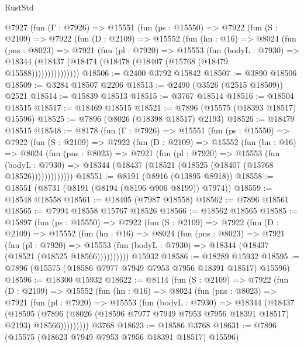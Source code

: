 \begin{lexlean}{RustStd}
\begin{coremodule}
    @7927
      (fun (Γ : @7926) =>
      @15551
        (fun (ps : @15550) =>
        @7922
          (fun (S : @2109) =>
          @7922
            (fun (D : @2109) =>
            @15552
              (fun (hn : @16) =>
              @8024
                (fun (pns : @8023) =>
                @7921
                  (fun (pl : @7920) =>
                  @15553
                    (fun (bodyL : @7930) =>
                    @18344 (@18437 (@18474 (@18478 (@18407 (@15768 (@18479 @15588)))))))))))))))
@18506 := @2400 @3792 @15842
@18507 := @3890 @18506
@18509 := @3284 @18507 @2206
@18513 := @2490 (@3526 (@2515 @18509)) @2521
@18514 := @15839 @18513
@18515 := @3767 @18514
@18516 := @18504 @18515
@18517 := @18469 @18515
@18521 := @7896 (@15575 (@18393 @18517) @15596)
@18525 := @7896 (@8026 (@18398 @18517) @2193)
@18526 := @18479 @18515
@18548 := @8178
    (fun (Γ : @7926) =>
    @15551
      (fun (ps : @15550) =>
      @7922
        (fun (S : @2109) =>
        @7922
          (fun (D : @2109) =>
          @15552
            (fun (hn : @16) =>
            @8024
              (fun (pns : @8023) =>
              @7921
                (fun (pl : @7920) =>
                @15553
                  (fun (bodyL : @7930) =>
                  @18344 (@18437 (@18521 (@18525 (@18407 (@15768 @18526)))))))))))))
@18551 := @8191 (@8916 (@13895 @8918))
@18558 := @18551 (@8731 (@8191 (@8194 (@8196 @906 @8199)) @7974))
@18559 := @18548 @18558
@18561 := @18405 (@7987 @18558)
@18562 := @7896 @18561
@18565 := @7994 @18558 @15767 @18526
@18566 := @18562 @18565
@18585 := @15897
    (fun (ps : @15550) =>
    @7922
      (fun (S : @2109) =>
      @7922
        (fun (D : @2109) =>
        @15552
          (fun (hn : @16) =>
          @8024
            (fun (pns : @8023) =>
            @7921
              (fun (pl : @7920) =>
              @15553 (fun (bodyL : @7930) => @18344 (@18437 (@18521 (@18525 @18566))))))))))
    @15932
@18586 := @18289 @15932
@18595 := @7896 (@15575 (@18586 @7977 @7949 @7953 @7956 @18391 @18517) @15596)
@18596 := @18300 @15932
@18622 := @8114
    (fun (S : @2109) =>
    @7922
      (fun (D : @2109) =>
      @15552
        (fun (hn : @16) =>
        @8024
          (fun (pns : @8023) =>
          @7921
            (fun (pl : @7920) =>
            @15553
              (fun (bodyL : @7930) =>
              @18344
                (@18437
                  (@18595
                    (@7896
                      (@8026 (@18596 @7977 @7949 @7953 @7956 @18391 @18517) @2193)
                      @18566)))))))))
    @3768
@18623 := @18586 @3768
@18631 := @7896 (@15575 (@18623 @7949 @7953 @7956 @18391 @18517) @15596)

\end{coremodule}
\end{lexlean}
